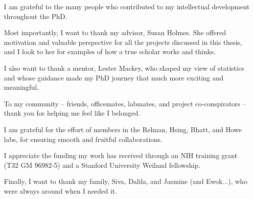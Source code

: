 
I am grateful to the many people who contributed to my intellectual development
throughout the PhD.

Most importantly, I want to thank my advisor, Susan Holmes. She offered
motivation and valuable perspective for all the projects discussed in this
thesis, and I look to her for examples of how a true scholar works and thinks.

I also want to thank a mentor, Lester Mackey, who shaped my view of statistics
and whose guidance made my PhD journey that much more exciting and meaningful.

To my community -- friends, officemates, labmates, and project co-conspirators
-- thank you for helping me feel like I belonged.

I am grateful for the effort of members in the Relman, Hsing, Bhatt, and Howe
labs, for ensuring smooth and fruitful collaborations.

I appreciate the funding my work has received through an NIH training grant (T32
GM 96982-5) and a Stanford University Weiland fellowship.

Finally, I want to thank my family, Siva, Dalila, and Jasmine (and Ewok...), who
were always around when I needed it.

